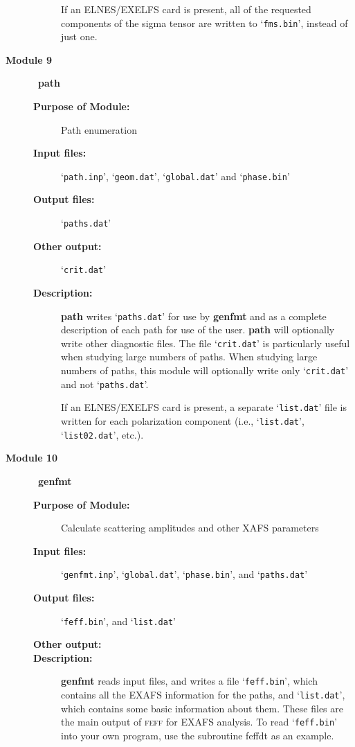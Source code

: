 \documentclass[11pt,oneside]{report} %
\newcommand{\program}[1]{\textsc{#1}}
\newcommand{\feff}{\program{feff}}
\newcommand{\file}[1]{`\texttt{#1}'}
\newcommand{\module}[1]{\textrm{\bf{#1}}}
\begin{document}
\begin{latexonly}
\begin{description}
\begin{description}
    If an ELNES/EXELFS card is present, all of the requested components 
    of the sigma tensor are written to \file{fms.bin}, instead of just one. 
  \end{description}
\item [\large\textbf{Module 9}]\dotfill\  {\large\module{path}}
  \begin{description}
  \item[\textbf{Purpose of Module:}] Path enumeration
  \item[\textbf{Input files:}] \file{path.inp}, \file{geom.dat},
     \file{global.dat} and \file{phase.bin}
  \item[\textbf{Output files:}] \file{paths.dat}
  \item[\textbf{Other output:}] \file{crit.dat}
  \item[\textbf{Description:}] \module{path} writes \file{paths.dat} for use 
    by \module{genfmt} and as a complete description of each path for use of 
    the user. \module{path} will optionally write other diagnostic files. 
    The file \file{crit.dat} is particularly useful when studying 
    large numbers of paths. When studying large numbers of paths, 
    this module will optionally write only \file{crit.dat} and 
    not \file{paths.dat}.

    If an ELNES/EXELFS card is present, a separate \file{list.dat} file is 
    written for each polarization component (i.e., \file{list.dat}, 
    \file{list02.dat}, etc.).
  \end{description}
\item [\large\textbf{Module 10}]\dotfill\  {\large\module{genfmt}}
  \begin{description}
  \item[\textbf{Purpose of Module:}] Calculate scattering amplitudes and other
    XAFS parameters
  \item[\textbf{Input files:}] \file{genfmt.inp},
    \file{global.dat}, \file{phase.bin}, and \file{paths.dat}
  \item[\textbf{Output files:}] \file{feff.bin}, and \file{list.dat}
  \item[\textbf{Other output:}]
  \item[\textbf{Description:}] \module{genfmt} reads input files, and writes a file
    \file{feff.bin}, which contains all the EXAFS information for the
    paths, and \file{list.dat}, which contains some basic information
    about them. These files are the main output of {\feff} for EXAFS
    analysis. To read \file{feff.bin} into your own program, use the 
    subroutine feffdt as an example.


\end{description}
\end{description}
\end{latexonly}
\end{document}
